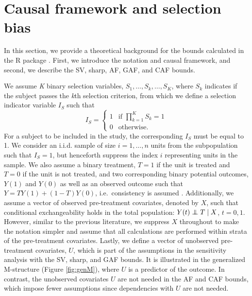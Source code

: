 \section{Causal framework and selection bias}\label{causal-framework-and-selection-bias}

In this section, we provide a theoretical background for the bounds calculated
in the R package . First, we introduce the notation and
causal framework, and second, we describe the SV, sharp, AF, GAF, and CAF bounds.

We assume \emph{K} binary selection variables, \(S_1,\dots,S_k,\dots,S_K\), where \(S_k\)
indicates if the subject passes the \emph{k}th selection criterion, from which we
define a selection indicator variable \(I_S\) such that
\begin{equation}
    I_S =
\left\{
    \begin{array}{ll}
        1  & \mbox{if } \prod\limits_{k=1}^KS_k=1  \\
        0 & \mbox{otherwise}. 
    \end{array}
\right.
    \label{eq:selInd}
\end{equation}
For a subject to be included in the study, the corresponding \(I_S\) must be equal
to 1. We consider an i.i.d. sample of size \(i=1,\ldots, n\) units from the
subpopulation such that \(I_S=1\), but henceforth suppress the index \(i\) representing
units in the sample. We also assume a binary treatment, \(T=1\) if the
unit is treated and \(T=0\) if the unit is not treated, and two corresponding
binary potential outcomes, \(Y(1)\) and \(Y(0)\) as well as an observed outcome such
that \(Y=TY(1)+(1-T)Y(0)\), i.e.~consistency is assumed \citep{DR74}. Additionally, we
assume a vector of observed pre-treatment covariates, denoted by \(X\), such that
conditional exchangeability holds in the total population: \(Y(t)\perp\hskip -6pt \perp T \mid X\),
\(t=0,1\). However, similar to the previous literature, we suppress \(X\)
throughout to make the notation simpler and assume that all calculations are
performed within strata of the pre-treatment covariates. Lastly, we define a
vector of unobserved pre-treatment covariates, \(U\), which is part of the
assumptions in the sensitivity analysis with the SV, sharp, and GAF bounds. It is
illustrated in the generalized M-structure (Figure \ref{fig:genM}), where \(U\)
is a predictor of the outcome. In contrast, the unobserved covariates
\(U\) are not needed in the AF and CAF bounds, which impose fewer assumptions since
dependencies with \(U\) are not needed.

